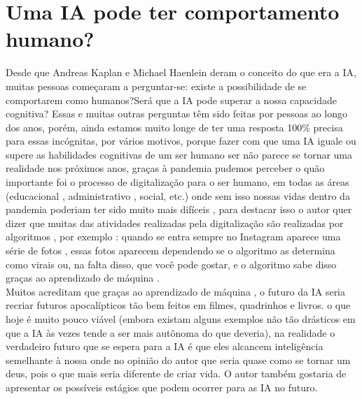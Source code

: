 \documentclass[a4paper]{report}
\begin{document}
\chapter{Uma \ac{IA} pode  ter comportamento humano?}\cite{ia}
Desde que Andreas Kaplan e Michael Haenlein deram o conceito do que era a \ac{IA}, muitas pessoas começaram a perguntar-se: existe a possibilidade de se comportarem como humanos?Será que a \ac{IA} pode superar a nossa capacidade cognitiva? Essas e muitas outras perguntas têm sido feitas por pessoas ao longo dos anos, porém, ainda estamos muito longe de ter uma resposta 100\% precisa para essas incógnitas, por vários motivos, porque fazer com que uma \ac{IA} iguale ou supere as habilidades cognitivas de um ser humano ser não parece se tornar uma realidade nos próximos anos, graças à pandemia pudemos perceber  o quão importante foi o processo de digitalização para o ser humano, em todas as áreas (educacional , administrativo  , social, etc.) onde sem isso nossas vidas dentro da pandemia poderiam ter sido muito mais difíceis , para destacar isso o  autor quer dizer que muitas das atividades realizadas pela digitalização são realizadas por algoritmos , por exemplo : quando se entra sempre no Instagram aparece uma série de fotos , essas fotos aparecem dependendo se o algoritmo as determina como virais ou, na falta disso, que você pode gostar, e o algoritmo sabe disso graças ao aprendizado de máquina .\\
    
Muitos acreditam que graças ao aprendizado de máquina , o futuro da \ac{IA} seria recriar futuros apocalípticos tão bem feitos em filmes, quadrinhos e livros. o que hoje é muito pouco viável (embora existam alguns exemplos não tão drásticos em que a \ac{IA} às vezes tende a ser mais autônoma do que deveria), na realidade o verdadeiro futuro que se espera para a \ac{IA} é que eles alcancem inteligência semelhante à nossa onde no opinião do autor que seria quase como se tornar um deus, pois o que mais seria diferente de criar vida. O autor também gostaria de apresentar os possíveis estágios que podem ocorrer para as \ac{IA} no futuro.\\
    
\end{document}
